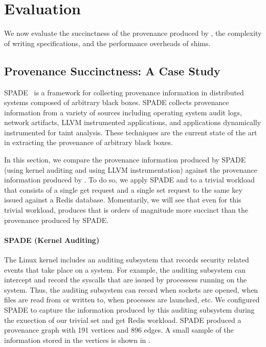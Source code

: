 \section{Evaluation}

We now evaluate the succinctness of the provenance produced by \fluent{}, the
complexity of writing \watprovenance{} specifications, and the performance
overheads of \fluent{} shims.

\subsection{Provenance Succinctness: A Case Study}
SPADE~\cite{gehani2012spade} is a framework for collecting provenance
information in distributed systems composed of arbitrary black boxes. SPADE
collects provenance information from a variety of sources including operating
system audit logs, network artifacts, LLVM instrumented applications, and
applications dynamically instrumented for taint analysis. These techniques are
the current state of the art in extracting the provenance of arbitrary black
boxes.

In this section, we compare the provenance information produced by SPADE (using
kernel auditing and using LLVM instrumentation) against the provenance
information produced by \fluent{}. To do so, we apply SPADE and \fluent{} to a
trivial workload that consists of a single get request and a single set request
to the same key issued against a Redis database. Momentarily, we will see that
even for this trivial workload, \fluent{} produces \watprovenance{} that is
orders of magnitude more succinct than the provenance produced by SPADE.

{}

\paragraph{SPADE (Kernel Auditing)}
The Linux kernel includes an auditing subsystem that records security related
events that take place on a system. For example, the auditing subsystem can
intercept and record the syscalls that are issued by processess running on the
system. Thus, the auditing subsystem can record when sockets are opened, when
files are read from or written to, when processes are launched, etc. We
configured SPADE to capture the information produced by this auditing subsystem
during the exuection of our trivial set and get Redis workload. SPADE produced
a provenance graph with 191 vertices and 896 edges. A small sample of the
information stored in the vertices is shown in .

